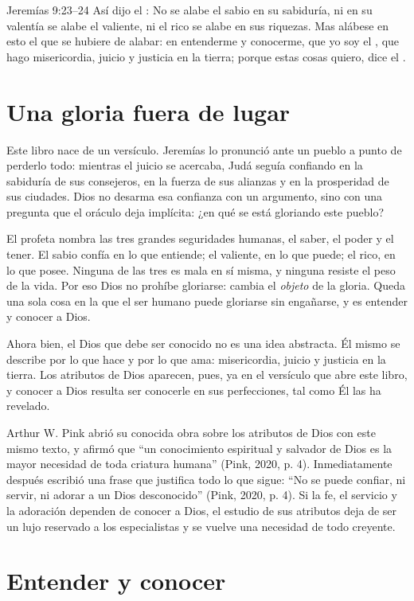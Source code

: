 \begin{verso}{Jeremías 9:23–24}
Así dijo el \SENOR: No se alabe el sabio en su sabiduría, ni en su valentía se alabe el valiente, ni el rico se alabe en sus riquezas. Mas alábese en esto el que se hubiere de alabar: en entenderme y conocerme, que yo soy el \SENOR, que hago misericordia, juicio y justicia en la tierra; porque estas cosas quiero, dice el \SENOR.
\end{verso}

\section{Una gloria fuera de lugar}

Este libro nace de un versículo. Jeremías lo pronunció ante un pueblo a punto de perderlo todo: mientras el juicio se acercaba, Judá seguía confiando en la sabiduría de sus consejeros, en la fuerza de sus alianzas y en la prosperidad de sus ciudades. Dios no desarma esa confianza con un argumento, sino con una pregunta que el oráculo deja implícita: ¿en qué se está gloriando este pueblo?

El profeta nombra las tres grandes seguridades humanas, el saber, el poder y el tener. El sabio confía en lo que entiende; el valiente, en lo que puede; el rico, en lo que posee. Ninguna de las tres es mala en sí misma, y ninguna resiste el peso de la vida. Por eso Dios no prohíbe gloriarse: cambia el \emph{objeto} de la gloria. Queda una sola cosa en la que el ser humano puede gloriarse sin engañarse, y es entender y conocer a Dios.

Ahora bien, el Dios que debe ser conocido no es una idea abstracta. Él mismo se describe por lo que hace y por lo que ama: misericordia, juicio y justicia en la tierra. Los atributos de Dios aparecen, pues, ya en el versículo que abre este libro, y conocer a Dios resulta ser conocerle en sus perfecciones, tal como Él las ha revelado.

Arthur W. Pink abrió su conocida obra sobre los atributos de Dios con este mismo texto, y afirmó que “un conocimiento espiritual y salvador de Dios es la mayor necesidad de toda criatura humana” (Pink, 2020, p. 4). Inmediatamente después escribió una frase que justifica todo lo que sigue: “No se puede confiar, ni servir, ni adorar a un Dios desconocido” (Pink, 2020, p. 4). Si la fe, el servicio y la adoración dependen de conocer a Dios, el estudio de sus atributos deja de ser un lujo reservado a los especialistas y se vuelve una necesidad de todo creyente.
\section{Entender y conocer}

